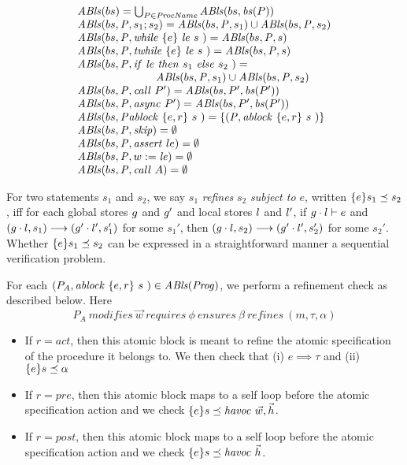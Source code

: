 $$
\begin{array}{l}
\mathit{ABls}(bs)   =   \bigcup_{P \in \mathit{ProcName}} \mathit{ABls}(bs, \mathit{bs}(P)) \\
\mathit{ABls}(bs, \mathit{P}, s_1; s_2)   =  \mathit{ABls}(bs, \mathit{P}, s_1) \cup 
                                                                                         \mathit{ABls}(bs, \mathit{P}, s_2) \\
 \mathit{ABls}(bs, \mathit{P}, \mathit{while}\ \{{e}\}\ {{\mathit{le}}\ } {{s}\ } )   =   \mathit{ABls}(bs,\mathit{P},  s) \\
\mathit{ABls}(bs, \mathit{P}, \mathit{twhile}\ \{{e}\}\ {{\mathit{le}}\ } {{s}\ } )   =   \mathit{ABls}(bs, \mathit{P},  s) \\
\mathit{ABls}(bs, \mathit{P}, {\mathit{if}\ {\mathit{le}}\ }{\mathit{then}\ {s_1}\ }{\mathit{else}\ {s_2}\ })   =   \\
\hspace*{2.5cm} \mathit{ABls}(bs, \mathit{P}, s_1) \cup \mathit{ABls}(bs, \mathit{P}, s_2) \\
\mathit{ABls}(bs, \mathit{P}, \mathit{call}\ P')   =   \mathit{ABls}(bs, P', \mathit{bs}(P') ) \\ 
\mathit{ABls}(bs, \mathit{P}, \mathit{async}\ P')   =   \mathit{ABls}(bs, P', \mathit{bs}(P') ) \\ 
\mathit{ABls}(bs, \mathit{P} \mathit{ablock}\ {\{e,r\}}\ {s}\ )   =   \{(\mathit{P}, \mathit{ablock}\ {\{e,r\}}\ {s}\ ) \} \\ 
\mathit{ABls}(bs, \mathit{P}, \mathit{skip})   =   \emptyset \\
\mathit{ABls}(bs, \mathit{P}, \mathit{assert}\ le)  =   \emptyset \\
\mathit{ABls}(bs, \mathit{P}, w := \mathit{le})   =   \emptyset \\
\mathit{ABls}(bs, \mathit{P}, \mathit{call}\ A)   =   \emptyset \\
\end{array}
$$

For two statements $s_1$ and $s_2$, we say $s_1$ {\em refines} $s_2$
{\em subject to $e$}, written $\{ {e} \} {s_1} \preceq {s_2}$, iff for each global
stores $g$ and $g'$ and local stores $l$ and $l'$,
if $g \cdot l \vdash e$ and $(g \cdot l, s_1)
\longrightarrow (g' \cdot l', s_1')$ for some $s_1'$, then $(g \cdot l, s_2)
\longrightarrow (g' \cdot l', s_2')$ for some $s_2'$. Whether $\{ {e} \} {s_1} \preceq {s_2}$ can be
expressed in a straightforward manner a sequential verification
problem.

For each $(P_{A}, \mathit{ablock}\ {\{e,r\}}\ {s}\ ) \in \mathit{ABls}(\mathit{Prog})$, we perform a refinement check as described below. Here 
$$P_{A}\ \mathit{modifies}\
\vec{w}\ \mathit{requires}\ \phi\ \mathit{ensures}\ \beta\
\mathit{refines}\ (m, \tau, \alpha)$$
\begin{itemize}
\item If $r = \mathit{act}$, then this atomic block is meant to refine the atomic specification of the procedure it belongs to. We then check that 
(i) $e \implies \tau$ and 
(ii) $\{ {e} \} {s} \preceq {\alpha}$
\item If $r = \mathit{pre}$, then this atomic block maps to a self loop before the atomic specification action and we check $\{ {e} \} {s} \preceq {\mathit{havoc }\ \vec{w}, \vec{h}}$. 
\item If $r = \mathit{post}$, then this atomic block maps to a self loop before the atomic specification action and we check $\impl{e}{s}{\mathit{havoc }\ \hiddenVars}$. 
\end{itemize}

